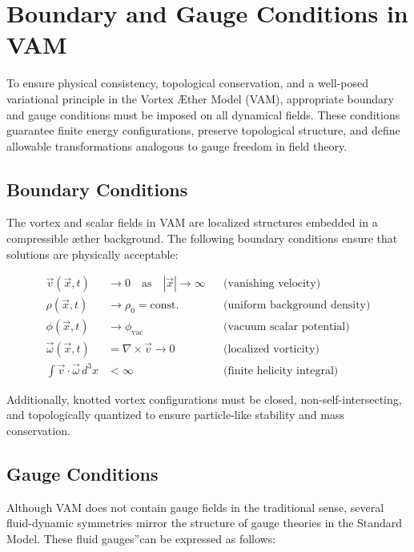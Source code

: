 \section{Boundary and Gauge Conditions in VAM}

To ensure physical consistency, topological conservation, and a well-posed variational principle in the Vortex Æther Model (VAM), appropriate boundary and gauge conditions must be imposed on all dynamical fields. These conditions guarantee finite energy configurations, preserve topological structure, and define allowable transformations analogous to gauge freedom in field theory.

\subsection{Boundary Conditions}

The vortex and scalar fields in VAM are localized structures embedded in a compressible æther background. The following boundary conditions ensure that solutions are physically acceptable:

\begin{align*}
    \vec{v}(\vec{x}, t) &\rightarrow 0 \quad \text{as} \quad |\vec{x}| \rightarrow \infty && \text{(vanishing velocity)} \\
    \rho(\vec{x}, t) &\rightarrow \rho_0 = \text{const.} && \text{(uniform background density)} \\
    \phi(\vec{x}, t) &\rightarrow \phi_{\text{vac}} && \text{(vacuum scalar potential)} \\
    \vec{\omega}(\vec{x}, t) &= \nabla \times \vec{v} \rightarrow 0 && \text{(localized vorticity)} \\
    \int \vec{v} \cdot \vec{\omega} \, d^3x &< \infty && \text{(finite helicity integral)}
\end{align*}

Additionally, knotted vortex configurations must be closed, non-self-intersecting, and topologically quantized to ensure particle-like stability and mass conservation.

\subsection{Gauge Conditions}

Although VAM does not contain gauge fields in the traditional sense, several fluid-dynamic symmetries mirror the structure of gauge theories in the Standard Model. These \grqq fluid gauges\textquotedblright can be expressed as follows:

